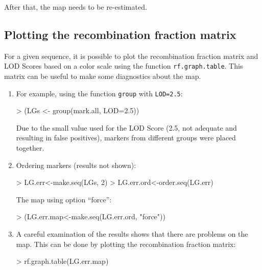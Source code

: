 \documentclass[letterpaper,12pt,oneside]{article}
\begin{document}
After that, the map needs to be re-estimated.

\subsection{Plotting the recombination fraction matrix}
\label{recmat}

For a given sequence, it is possible to plot the recombination fraction matrix and LOD Scores based on a color scale using the function {\tt rf.graph.table}. This matrix can be useful to make some diagnostics about the map. 
  
\begin{enumerate}
\item For example, using the function {\tt group} with {\tt LOD=2.5}:

\begin{Schunk}
\begin{Sinput}
> (LGs <- group(mark.all, LOD=2.5))
\end{Sinput}
\end{Schunk}

Due to the small value used for the LOD Score (2.5, not adequate and resulting in false positives), markers from different groups were placed together.

\item Ordering markers (results not shown):

\begin{Schunk}
\begin{Sinput}
> LG.err<-make.seq(LGs, 2)
> LG.err.ord<-order.seq(LG.err)
\end{Sinput}
\end{Schunk}

The map using option ``force'':

\begin{Schunk}
\begin{Sinput}
> (LG.err.map<-make.seq(LG.err.ord, "force"))
\end{Sinput}
\end{Schunk}


\item A careful examination of the results shows that there are problems on the map. This can be done by plotting the recombination fraction matrix:

\begin{Schunk}
\begin{Sinput}
> rf.graph.table(LG.err.map)
\end{Sinput}
\end{Schunk}




\end{enumerate}
\end{document}
